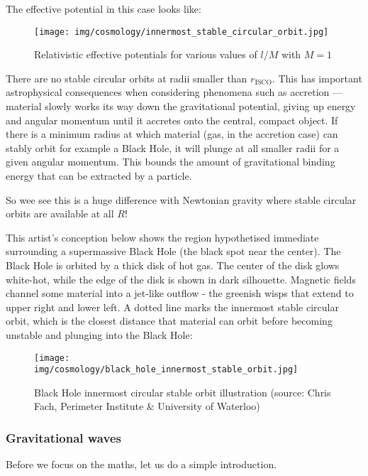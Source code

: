 	The effective potential in this case looks like:
	\begin{figure}[H]
		\centering
		\texttt{[image: img/cosmology/innermost\_stable\_circular\_orbit.jpg]}
		\caption{Relativistic effective potentials for various values of $l/M$ with $M=1$}
	\end{figure}
	There are no stable circular orbits at radii smaller than $r_\text{ISCO}$. This has important astrophysical consequences when considering phenomena such as accretion — material slowly works its way down the gravitational potential, giving up energy and angular momentum until it accretes onto the central, compact object. If there is a minimum radius at which material (gas, in the accretion case) can stably orbit for example a Black Hole, it will plunge at all smaller radii for a given angular momentum. This bounds the amount of gravitational binding energy that can be extracted by a particle.
	
	So wee see this is a huge difference with Newtonian gravity where stable circular orbits are available at all $R$!
	
	This artist's conception below shows the region hypothetised immediate surrounding a supermassive Black Hole (the black spot near the center). The Black Hole is orbited by a thick disk of hot gas. The center of the disk glows white-hot, while the edge of the disk is shown in dark silhouette. Magnetic fields channel some material into a jet-like outflow - the greenish wisps that extend to upper right and lower left. A dotted line marks the innermost stable circular orbit, which is the closest distance that material can orbit before becoming unstable and plunging into the Black Hole:
	\begin{figure}[H]
		\centering
		\texttt{[image: img/cosmology/black\_hole\_innermost\_stable\_orbit.jpg]}
		\captionsetup{width=0.6\linewidth}
		\caption[Black Hole innermost circular stable orbit illustration]{Black Hole innermost circular stable orbit illustration (source: Chris Fach, Perimeter Institute \& University of Waterloo)}
	\end{figure}
		
	\pagebreak
	\subsubsection{Gravitational waves}
	Before we focus on the maths, let us do a simple introduction.
	
